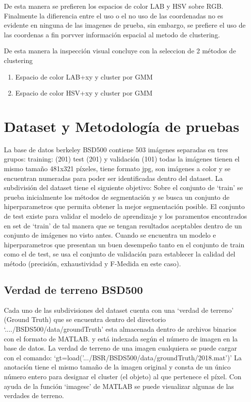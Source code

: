 \documentclass[10pt,twocolumn,letterpaper]{article}
\begin{document}
De esta manera se prefieren los espacios de color LAB y HSV sobre RGB. Finalmente la difierencia entre el uso o el no uso de las coordenadas no es evidente en ninguna de las imagenes de prueba, sin embargo, se prefiere el uso de las coordenas a fin porvver información espacial al metodo de clustering.


De esta manera la inspección visual concluye con la seleccion de 2 métodos de clustering
\begin{enumerate}
	\item Espacio de color LAB+xy y cluster por GMM
	\item Espacio de color HSV+xy y cluster por GMM
\end{enumerate}



\section{Dataset y Metodología de pruebas}

La base de datos berkeley BSD500 contiene 503 imágenes  separadas en tres  grupos: training: (201) test (201) y validación (101) todas la imágenes tienen el mismo tamaño 481x321 píxeles, tiene formato jpg, son imágenes a color y se encuentran numeradas para poder ser identificadas dentro del dataset.
La subdivisión del dataset tiene el siguiente objetivo: Sobre el conjunto de ‘train’ se prueba inicialmente los métodos de segmentación y se busca un conjunto de  hiperparametros que permita obtener la mejor segmentación posible. El conjunto de test existe para validar el modelo de aprendizaje y los paramentos encontrados en set de ‘train’ de tal manera que se tengan resultados aceptables dentro de un conjunto de imágenes no visto antes. Cuando se encuentra un modelo e hiperparametros que presentan un buen desempeño tanto en el conjunto de train como el de test, se usa el conjunto de validación para establecer la calidad del método (precisión, exhaustividad y F-Medida en este caso).

\subsection{Verdad de terreno BSD500}

Cada uno de las subdivisiones del dataset cuenta con una ‘verdad de terreno’ (Ground Truth) que se encuentra dentro del directorio ‘..../BSDS500/data/groundTruth’ esta almacenada dentro de archivos binarios con el formato de MATLAB. y está indexada según el número de imagen en la base de datos.  La verdad de terreno de una imagen cualquiera se puede cargar con el comando:
‘gt=load('.../BSR/BSDS500/data/groundTruth/2018.mat')’
La anotación tiene el mismo tamaño de la imagen original y consta de un único número entero para designar el cluster (el objeto) al que pertenece el píxel. Con ayuda de la función ‘imagesc’ de MATLAB se puede visualizar algunas de las verdades de terreno.
\end{document}
